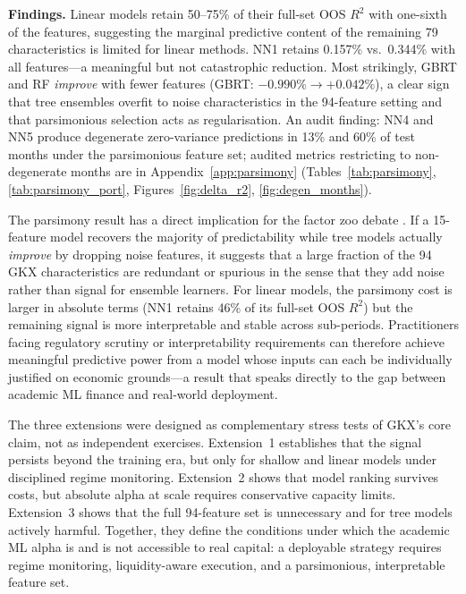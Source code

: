 \documentclass[11pt,a4paper]{article}
\begin{document}
\vspace{4pt}
\textbf{Findings.} Linear models retain 50--75\% of their full-set OOS $R^2$ with one-sixth of the features, suggesting the marginal predictive content of the remaining 79 characteristics is limited for linear methods. NN1 retains 0.157\% vs.\ 0.344\% with all features---a meaningful but not catastrophic reduction. Most strikingly, GBRT and RF \textit{improve} with fewer features (GBRT: $-0.990\% \to +0.042\%$), a clear sign that tree ensembles overfit to noise characteristics in the 94-feature setting and that parsimonious selection acts as regularisation. An audit finding: NN4 and NN5 produce degenerate zero-variance predictions in 13\% and 60\% of test months under the parsimonious feature set; audited metrics restricting to non-degenerate months are in Appendix~\ref{app:parsimony} (Tables~\ref{tab:parsimony}, \ref{tab:parsimony_port}, Figures~\ref{fig:delta_r2}, \ref{fig:degen_months}).

The parsimony result has a direct implication for the factor zoo debate \citep{Harvey2016}. If a 15-feature model recovers the majority of predictability while tree models actually \textit{improve} by dropping noise features, it suggests that a large fraction of the 94 GKX characteristics are redundant or spurious in the sense that they add noise rather than signal for ensemble learners. For linear models, the parsimony cost is larger in absolute terms (NN1 retains 46\% of its full-set OOS $R^2$) but the remaining signal is more interpretable and stable across sub-periods. Practitioners facing regulatory scrutiny or interpretability requirements can therefore achieve meaningful predictive power from a model whose inputs can each be individually justified on economic grounds---a result that speaks directly to the gap between academic ML finance and real-world deployment.

The three extensions were designed as complementary stress tests of GKX's core claim, not as independent exercises. Extension~1 establishes that the signal persists beyond the training era, but only for shallow and linear models under disciplined regime monitoring. Extension~2 shows that model ranking survives costs, but absolute alpha at scale requires conservative capacity limits. Extension~3 shows that the full 94-feature set is unnecessary and for tree models actively harmful. Together, they define the conditions under which the academic ML alpha is and is not accessible to real capital: a deployable strategy requires regime monitoring, liquidity-aware execution, and a parsimonious, interpretable feature set.
\end{document}
